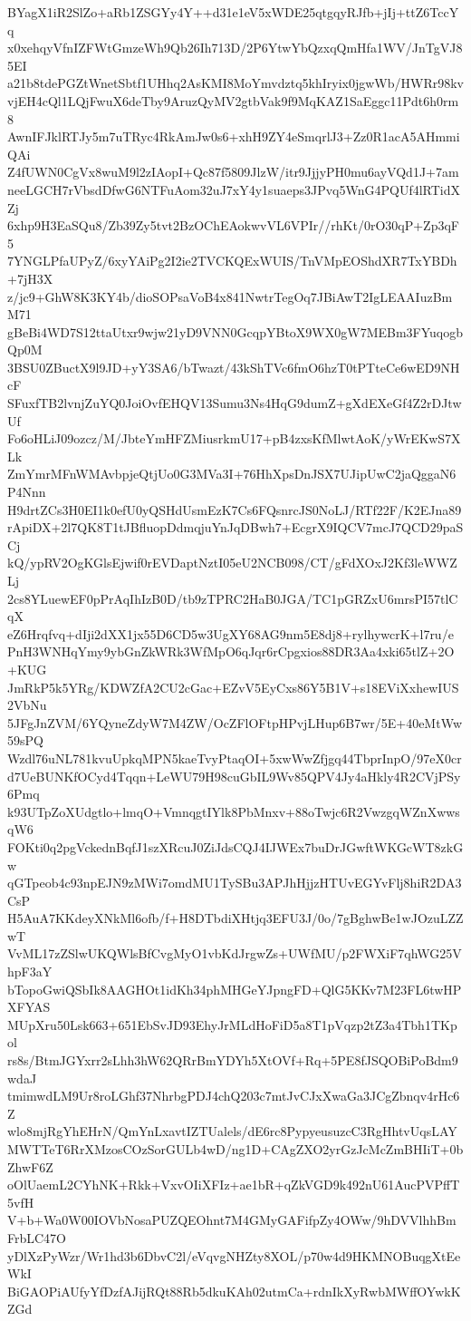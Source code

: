 BYagX1iR2SlZo+aRb1ZSGYy4Y++d31e1eV5xWDE25qtgqyRJfb+jIj+ttZ6TccYq
x0xehqyVfnIZFWtGmzeWh9Qb26Ih713D/2P6YtwYbQzxqQmHfa1WV/JnTgVJ85EI
a21b8tdePGZtWnetSbtf1UHhq2AsKMI8MoYmvdztq5khIryix0jgwWb/HWRr98kv
vjEH4cQl1LQjFwuX6deTby9AruzQyMV2gtbVak9f9MqKAZ1SaEggc11Pdt6h0rm8
AwnIFJklRTJy5m7uTRyc4RkAmJw0s6+xhH9ZY4eSmqrlJ3+Zz0R1acA5AHmmiQAi
Z4fUWN0CgVx8wuM9l2zIAopI+Qc87f5809JlzW/itr9JjjyPH0mu6ayVQd1J+7am
neeLGCH7rVbsdDfwG6NTFuAom32uJ7xY4y1suaeps3JPvq5WnG4PQUf4lRTidXZj
6xhp9H3EaSQu8/Zb39Zy5tvt2BzOChEAokwvVL6VPIr//rhKt/0rO30qP+Zp3qF5
7YNGLPfaUPyZ/6xyYAiPg2I2ie2TVCKQExWUIS/TnVMpEOShdXR7TxYBDh+7jH3X
z/jc9+GhW8K3KY4b/dioSOPsaVoB4x841NwtrTegOq7JBiAwT2IgLEAAIuzBmM71
gBeBi4WD7S12ttaUtxr9wjw21yD9VNN0GcqpYBtoX9WX0gW7MEBm3FYuqogbQp0M
3BSU0ZBuctX9l9JD+yY3SA6/bTwazt/43kShTVc6fmO6hzT0tPTteCe6wED9NHcF
SFuxfTB2lvnjZuYQ0JoiOvfEHQV13Sumu3Ns4HqG9dumZ+gXdEXeGf4Z2rDJtwUf
Fo6oHLiJ09ozcz/M/JbteYmHFZMiusrkmU17+pB4zxsKfMlwtAoK/yWrEKwS7XLk
ZmYmrMFnWMAvbpjeQtjUo0G3MVa3I+76HhXpsDnJSX7UJipUwC2jaQggaN6P4Nnn
H9drtZCs3H0EI1k0efU0yQSHdUsmEzK7Cs6FQsnrcJS0NoLJ/RTf22F/K2EJna89
rApiDX+2l7QK8T1tJBfluopDdmqjuYnJqDBwh7+EcgrX9IQCV7mcJ7QCD29paSCj
kQ/ypRV2OgKGlsEjwif0rEVDaptNztI05eU2NCB098/CT/gFdXOxJ2Kf3leWWZLj
2cs8YLuewEF0pPrAqIhIzB0D/tb9zTPRC2HaB0JGA/TC1pGRZxU6mrsPI57tlCqX
eZ6Hrqfvq+dIji2dXX1jx55D6CD5w3UgXY68AG9nm5E8dj8+rylhywcrK+l7ru/e
PnH3WNHqYmy9ybGnZkWRk3WfMpO6qJqr6rCpgxios88DR3Aa4xki65tlZ+2O+KUG
JmRkP5k5YRg/KDWZfA2CU2cGac+EZvV5EyCxs86Y5B1V+s18EViXxhewIUS2VbNu
5JFgJnZVM/6YQyneZdyW7M4ZW/OcZFlOFtpHPvjLHup6B7wr/5E+40eMtWw59sPQ
Wzdl76uNL781kvuUpkqMPN5kaeTvyPtaqOI+5xwWwZfjgq44TbprInpO/97eX0cr
d7UeBUNKfOCyd4Tqqn+LeWU79H98cuGbIL9Wv85QPV4Jy4aHkly4R2CVjPSy6Pmq
k93UTpZoXUdgtlo+lmqO+VmnqgtIYlk8PbMnxv+88oTwjc6R2VwzgqWZnXwwsqW6
FOKti0q2pgVckednBqfJ1szXRcuJ0ZiJdsCQJ4IJWEx7buDrJGwftWKGcWT8zkGw
qGTpeob4c93npEJN9zMWi7omdMU1TySBu3APJhHjjzHTUvEGYvFlj8hiR2DA3CsP
H5AuA7KKdeyXNkMl6ofb/f+H8DTbdiXHtjq3EFU3J/0o/7gBghwBe1wJOzuLZZwT
VvML17zZSlwUKQWlsBfCvgMyO1vbKdJrgwZs+UWfMU/p2FWXiF7qhWG25VhpF3aY
bTopoGwiQSbIk8AAGHOt1idKh34phMHGeYJpngFD+QlG5KKv7M23FL6twHPXFYAS
MUpXru50Lsk663+651EbSvJD93EhyJrMLdHoFiD5a8T1pVqzp2tZ3a4Tbh1TKpol
rs8s/BtmJGYxrr2sLhh3hW62QRrBmYDYh5XtOVf+Rq+5PE8fJSQOBiPoBdm9wdaJ
tmimwdLM9Ur8roLGhf37NhrbgPDJ4chQ203c7mtJvCJxXwaGa3JCgZbnqv4rHc6Z
wlo8mjRgYhEHrN/QmYnLxavtIZTUalels/dE6rc8PypyeusuzcC3RgHhtvUqsLAY
MWTTeT6RrXMzosCOzSorGULb4wD/ng1D+CAgZXO2yrGzJcMcZmBHIiT+0bZhwF6Z
oOlUaemL2CYhNK+Rkk+VxvOIiXFIz+ae1bR+qZkVGD9k492nU61AucPVPffT5vfH
V+b+Wa0W00IOVbNosaPUZQEOhnt7M4GMyGAFifpZy4OWw/9hDVVlhhBmFrbLC47O
yDlXzPyWzr/Wr1hd3b6DbvC2l/eVqvgNHZty8XOL/p70w4d9HKMNOBuqgXtEeWkI
BiGAOPiAUfyYfDzfAJijRQt88Rb5dkuKAh02utmCa+rdnIkXyRwbMWffOYwkKZGd
